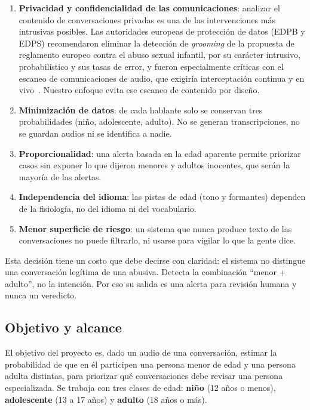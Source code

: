 \documentclass[11pt,a4paper]{article}
\newcommand{\gr}{\emph{grooming}}
\begin{document}
\begin{enumerate}
  \item \textbf{Privacidad y confidencialidad de las comunicaciones}: analizar el contenido de conversaciones privadas es una de las intervenciones más intrusivas posibles. Las autoridades europeas de protección de datos (EDPB y EDPS) recomendaron eliminar la detección de \gr{} de la propuesta de reglamento europeo contra el abuso sexual infantil, por su carácter intrusivo, probabilístico y sus tasas de error, y fueron especialmente críticas con el escaneo de comunicaciones de audio, que exigiría interceptación continua y en vivo~\cite{edpb2022}. Nuestro enfoque evita ese escaneo de contenido por diseño.
  \item \textbf{Minimización de datos}: de cada hablante solo se conservan tres probabilidades (niño, adolescente, adulto). No se generan transcripciones, no se guardan audios ni se identifica a nadie.
  \item \textbf{Proporcionalidad}: una alerta basada en la edad aparente permite priorizar casos sin exponer lo que dijeron menores y adultos inocentes, que serán la mayoría de las alertas.
  \item \textbf{Independencia del idioma}: las pistas de edad (tono y formantes) dependen de la fisiología, no del idioma ni del vocabulario.
  \item \textbf{Menor superficie de riesgo}: un sistema que nunca produce texto de las conversaciones no puede filtrarlo, ni usarse para vigilar lo que la gente dice.
\end{enumerate}

Esta decisión tiene un costo que debe decirse con claridad: el sistema no distingue una conversación legítima de una abusiva. Detecta la combinación ``menor + adulto'', no la intención. Por eso su salida es una alerta para revisión humana y nunca un veredicto.

\subsection{Objetivo y alcance}

El objetivo del proyecto es, dado un audio de una conversación, estimar la probabilidad de que en él participen una persona menor de edad y una persona adulta distintas, para priorizar qué conversaciones debe revisar una persona especializada. Se trabaja con tres clases de edad: \textbf{niño} (12 años o menos), \textbf{adolescente} (13 a 17 años) y \textbf{adulto} (18 años o más).
\end{document}

